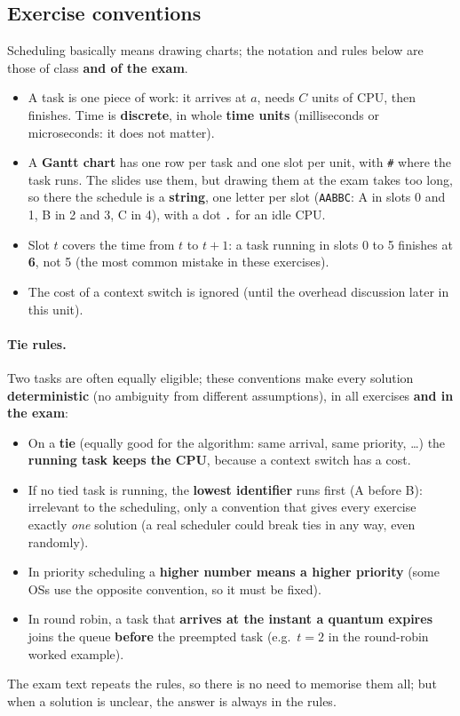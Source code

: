 \subsection{Exercise conventions}\label{w05:conventions}
Scheduling basically means drawing charts; the notation and rules below are those of class \textbf{and of the exam}.
\begin{itemize}
    \item A task is one piece of work: it arrives at $a$, needs $C$ units of CPU, then finishes. Time is \textbf{discrete}, in whole \textbf{time units} (milliseconds or microseconds: it does not matter).
    \item A \textbf{Gantt chart} has one row per task and one slot per unit, with \texttt{\#} where the task runs. The slides use them, but drawing them at the exam takes too long, so there the schedule is a \textbf{string}, one letter per slot (\texttt{AABBC}: A in slots 0 and 1, B in 2 and 3, C in 4), with a dot \texttt{.} for an idle CPU.
    \item Slot $t$ covers the time from $t$ to $t+1$: a task running in slots 0 to 5 finishes at \textbf{6}, not 5 (the most common mistake in these exercises).
    \item The cost of a context switch is ignored (until the overhead discussion later in this unit).
\end{itemize}

\paragraph{Tie rules.} Two tasks are often equally eligible; these conventions make every solution \textbf{deterministic} (no ambiguity from different assumptions), in all exercises \textbf{and in the exam}:
\begin{itemize}
    \item On a \textbf{tie} (equally good for the algorithm: same arrival, same priority, \dots) the \textbf{running task keeps the CPU}, because a context switch has a cost.
    \item If no tied task is running, the \textbf{lowest identifier} runs first (A before B): irrelevant to the scheduling, only a convention that gives every exercise exactly \emph{one} solution (a real scheduler could break ties in any way, even randomly).
    \item In priority scheduling a \textbf{higher number means a higher priority} (some OSs use the opposite convention, so it must be fixed).
    \item In round robin, a task that \textbf{arrives at the instant a quantum expires} joins the queue \textbf{before} the preempted task (e.g.\ $t=2$ in the round-robin worked example).
\end{itemize}
The exam text repeats the rules, so there is no need to memorise them all; but when a solution is unclear, the answer is always in the rules.

